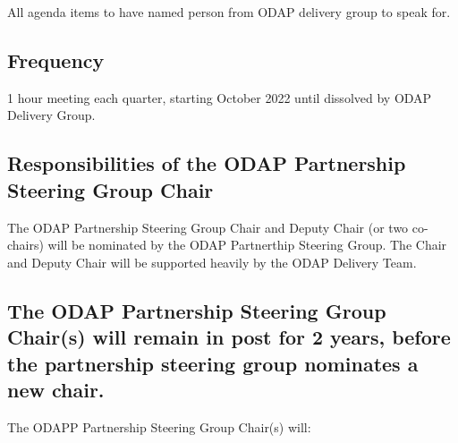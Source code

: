 \documentclass[
]{article}
\begin{document}
All agenda items to have named person from ODAP delivery group to speak
for.

\hypertarget{frequency}{%
\subsection{Frequency}\label{frequency}}

1 hour meeting each quarter, starting October 2022 until dissolved by
ODAP Delivery Group.

\hypertarget{responsibilities-of-the-odap-partnership-steering-group-chair}{%
\subsection{Responsibilities of the ODAP Partnership Steering Group
Chair}\label{responsibilities-of-the-odap-partnership-steering-group-chair}}

The ODAP Partnership Steering Group Chair and Deputy Chair (or two
co-chairs) will be nominated by the ODAP Partnerthip Steering Group. The
Chair and Deputy Chair will be supported heavily by the ODAP Delivery
Team.

\hypertarget{the-odap-partnership-steering-group-chairs-will-remain-in-post-for-2-years-before-the-partnership-steering-group-nominates-a-new-chair.}{%
\subsection{The ODAP Partnership Steering Group Chair(s) will remain in
post for 2 years, before the partnership steering group nominates a new
chair.}\label{the-odap-partnership-steering-group-chairs-will-remain-in-post-for-2-years-before-the-partnership-steering-group-nominates-a-new-chair.}}

The ODAPP Partnership Steering Group Chair(s) will:
\end{document}
